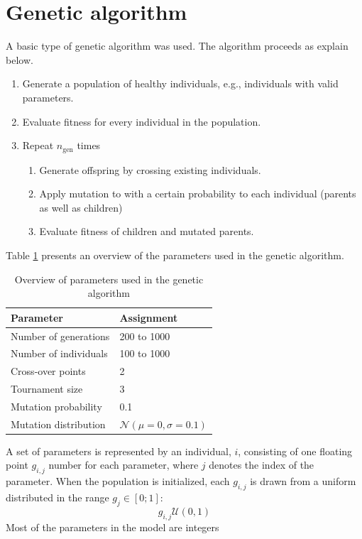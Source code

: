 \section{Genetic algorithm}\label{section:genetic_algorithm}
A basic type of genetic algorithm was used. The algorithm proceeds as explain below.
\begin{enumerate}
\item Generate a population of healthy individuals, e.g., individuals with valid parameters.
\item Evaluate fitness for every individual in the population.
\item Repeat $n_\text{gen}$ times 
\begin{enumerate}
\item Generate offspring by crossing existing individuals.
\item Apply mutation to with a certain probability to each individual (parents as well as children)
\item Evaluate fitness of children and mutated parents.
\end{enumerate}
\end{enumerate}
Table \ref{table:genetic_algorithm_parameters} presents an overview of the parameters used in the genetic algorithm. 
\begin{table}
\centering
\begin{tabular}{l|l}
Parameter & Assignment\\\hline
Number of generations & 200 to 1000\\
Number of individuals & 100 to 1000\\
Cross-over points & 2\\
Tournament size & 3\\
Mutation probability & 0.1\\
Mutation distribution &  $\mathcal{N}(\mu = 0, \sigma = 0.1)$\\
\end{tabular}
\caption{Overview of parameters used in the genetic algorithm}
\label{table:genetic_algorithm_parameters}
\end{table}
A set of parameters is represented by an individual, $i$, consisting of one floating point $g_{i,j}$ number for each parameter, where $j$ denotes the index of the parameter. When the population is initialized, each $g_{i,j}$ is drawn from a uniform distributed in the range $g_j \in [0;1]$:
\begin{equation}
g_{i,j} \mathcal{U}(0,1)
\end{equation}
Most of the parameters in the model are integers




